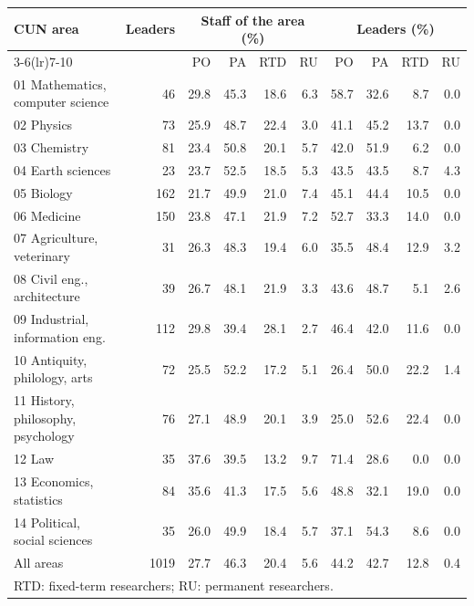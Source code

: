 \documentclass[11pt,a4paper]{article}
\begin{document}
\begin{table}[H]
\centering
\scriptsize\setlength{\tabcolsep}{3pt}
\begin{tabular}{lrrrrrrrrr}
\toprule
\multirow{2}{*}{CUN area} & \multirow{2}{*}{Leaders} & \multicolumn{4}{c}{Staff of the area (\%)} & \multicolumn{4}{c}{Leaders (\%)} \\
\cmidrule(lr){3-6}\cmidrule(lr){7-10}
 &  & PO & PA & RTD & RU & PO & PA & RTD & RU \\
\midrule
01 Mathematics, computer science & 46 & 29.8 & 45.3 & 18.6 & 6.3 & 58.7 & 32.6 & 8.7 & 0.0 \\
02 Physics & 73 & 25.9 & 48.7 & 22.4 & 3.0 & 41.1 & 45.2 & 13.7 & 0.0 \\
03 Chemistry & 81 & 23.4 & 50.8 & 20.1 & 5.7 & 42.0 & 51.9 & 6.2 & 0.0 \\
04 Earth sciences & 23 & 23.7 & 52.5 & 18.5 & 5.3 & 43.5 & 43.5 & 8.7 & 4.3 \\
05 Biology & 162 & 21.7 & 49.9 & 21.0 & 7.4 & 45.1 & 44.4 & 10.5 & 0.0 \\
06 Medicine & 150 & 23.8 & 47.1 & 21.9 & 7.2 & 52.7 & 33.3 & 14.0 & 0.0 \\
07 Agriculture, veterinary & 31 & 26.3 & 48.3 & 19.4 & 6.0 & 35.5 & 48.4 & 12.9 & 3.2 \\
08 Civil eng., architecture & 39 & 26.7 & 48.1 & 21.9 & 3.3 & 43.6 & 48.7 & 5.1 & 2.6 \\
09 Industrial, information eng. & 112 & 29.8 & 39.4 & 28.1 & 2.7 & 46.4 & 42.0 & 11.6 & 0.0 \\
10 Antiquity, philology, arts & 72 & 25.5 & 52.2 & 17.2 & 5.1 & 26.4 & 50.0 & 22.2 & 1.4 \\
11 History, philosophy, psychology & 76 & 27.1 & 48.9 & 20.1 & 3.9 & 25.0 & 52.6 & 22.4 & 0.0 \\
12 Law & 35 & 37.6 & 39.5 & 13.2 & 9.7 & 71.4 & 28.6 & 0.0 & 0.0 \\
13 Economics, statistics & 84 & 35.6 & 41.3 & 17.5 & 5.6 & 48.8 & 32.1 & 19.0 & 0.0 \\
14 Political, social sciences & 35 & 26.0 & 49.9 & 18.4 & 5.7 & 37.1 & 54.3 & 8.6 & 0.0 \\
\midrule
All areas & 1019 & 27.7 & 46.3 & 20.4 & 5.6 & 44.2 & 42.7 & 12.8 & 0.4 \\
\bottomrule
\multicolumn{10}{l}{\footnotesize RTD: fixed-term researchers; RU: permanent researchers.} \\
\end{tabular}
\end{table}
\end{document}
